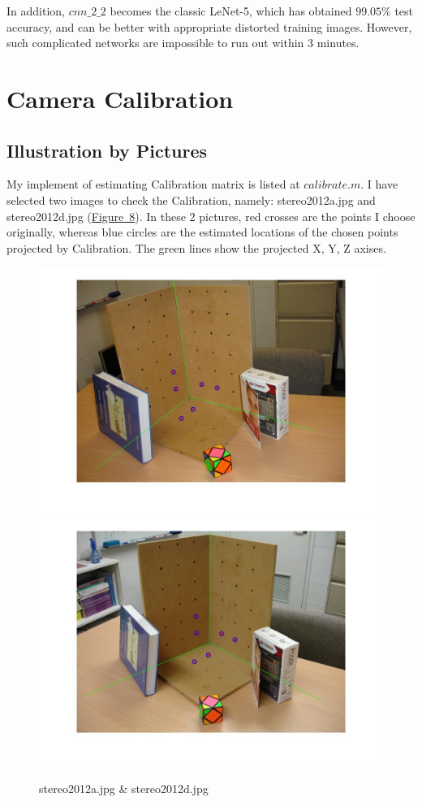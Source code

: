 \documentclass{article}
\begin{document}
In addition, $cnn\_2\_2$ becomes the classic LeNet-5\cite{LeNet}, which has obtained $99.05\%$ test accuracy, and can be better with appropriate distorted training images. However, such complicated networks are impossible to run out within 3 minutes.


\section{Camera Calibration}
\subsection{Illustration by Pictures}
My implement of estimating Calibration matrix is listed at \hyperref[code-2.1]{$calibrate.m$}. I have selected two images to check the Calibration, namely: stereo2012a.jpg and stereo2012d.jpg (\hyperref[fig-2.1]{Figure~8}). In these 2 pictures, red crosses are the points I choose originally, whereas blue circles are the estimated locations of the chosen points projected by Calibration. The green lines show the projected X, Y, Z axises.

\begin{figure}
	\centering
	\centering
	\includegraphics[scale=0.4]{a_cali.jpg}
	\includegraphics[scale=0.4]{d_cali.jpg}
	\caption{stereo2012a.jpg \& stereo2012d.jpg}
	\label{fig-2.1}
\end{figure}
\end{document}
